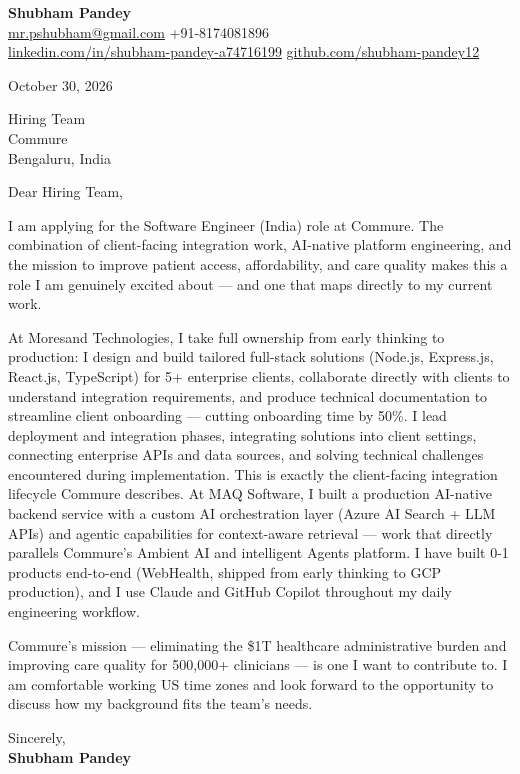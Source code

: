 \documentclass[a4paper,11pt]{article}
\begin{document}
\textbf{\Large Shubham Pandey}\\
\href{mailto:mr.pshubham@gmail.com}{mr.pshubham@gmail.com} \quad +91-8174081896\\
\href{https://www.linkedin.com/in/shubham-pandey-a74716199/}{linkedin.com/in/shubham-pandey-a74716199} \quad
\href{https://github.com/shubham-pandey12}{github.com/shubham-pandey12}

\vspace{1em}
October 30, 2026

\vspace{1em}
Hiring Team\\
Commure\\
Bengaluru, India

\vspace{1em}
Dear Hiring Team,

I am applying for the Software Engineer (India) role at Commure. The combination of client-facing integration work, AI-native platform engineering, and the mission to improve patient access, affordability, and care quality makes this a role I am genuinely excited about --- and one that maps directly to my current work.

At Moresand Technologies, I take full ownership from early thinking to production: I design and build tailored full-stack solutions (Node.js, Express.js, React.js, TypeScript) for 5+ enterprise clients, collaborate directly with clients to understand integration requirements, and produce technical documentation to streamline client onboarding --- cutting onboarding time by 50\%. I lead deployment and integration phases, integrating solutions into client settings, connecting enterprise APIs and data sources, and solving technical challenges encountered during implementation. This is exactly the client-facing integration lifecycle Commure describes. At MAQ Software, I built a production AI-native backend service with a custom AI orchestration layer (Azure AI Search + LLM APIs) and agentic capabilities for context-aware retrieval --- work that directly parallels Commure's Ambient AI and intelligent Agents platform. I have built 0-1 products end-to-end (WebHealth, shipped from early thinking to GCP production), and I use Claude and GitHub Copilot throughout my daily engineering workflow.

Commure's mission --- eliminating the \$1T healthcare administrative burden and improving care quality for 500,000+ clinicians --- is one I want to contribute to. I am comfortable working US time zones and look forward to the opportunity to discuss how my background fits the team's needs.

\vspace{1em}
Sincerely,\\[0.5em]
\textbf{Shubham Pandey}
\end{document}
